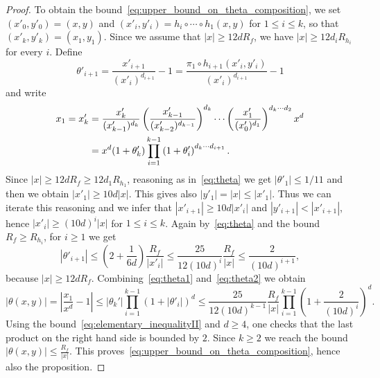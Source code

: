 \documentclass[oneside, 12pt]{amsart}
\newcommand{\abs}[1]{\left\vert#1\right\vert}
\newcommand{\lrpar}[1]{\left(#1\right)}
\theoremstyle{plain}
\theoremstyle{definition}
\numberwithin{equation}{section}       %
\numberwithin{equation}{section}       %
\begin{document}
\begin{proof}
To obtain the bound~\eqref{eq:upper_bound_on_theta_composition}, we set $(x'_0, y'_0)  = (x,y)$ and 
$(x'_i, y'_i) = h_i\circ\cdots \circ h_1 (x,y)$ for $1\leq i\leq k$, so that 
$(x'_k, y'_k) = (x_1, y_1)$. Since  we assume that 
$\abs{x}\geq 12dR_f$, we have $\abs{x}\geq 12d_iR_{h_i}$ for every $i$. 
Define 
\begin{equation}
\theta'_{i+1}   = \frac{x'_{i+1}}{(x'_i)^{d_{i+1}}} - 1 = \frac{\pi_1\circ h_{i+1} (x'_i, y'_i)}{(x'_i)^{d_{i+1}}} - 1
\end{equation}
and write 
\begin{align}\label{eq:theta1}
\notag x_1 = x'_k &= \frac{x'_k}{(x'_{k-1})^{d_k}}\lrpar{\frac{x'_{k-1}}{(x'_{k-2})^{d_{k-1}}}}^{d_k}\cdots 
\lrpar{\frac{x'_1}{(x'_0)^{d_1}}}^{d_k\cdots d_2} x^d\\ 
  &=  x^d (1+\theta'_k) \prod_{i=1}^{k-1} \lrpar{1+ \theta'_{i}}^{d_k\cdots d_{i+1}}. 
\end{align}
Since $\abs{x}\geq 12dR_f\geq 12 d_1R_{h_1}$, 
reasoning as in~\eqref{eq:theta} we get $\abs{\theta'_1}\leq 1/11$ and then we obtain $\abs{x'_1}\geq   10d \abs{x}$. 
This gives also $\abs{y'_1}  =     \abs{x}\leq \abs{x'_1}$. 
Thus we can iterate this reasoning and  we infer that 
$\abs{x'_{i+1}}%
\geq 10d \abs{x'_i}$ and  $\abs{y'_{i+1}} < \abs{x'_{i+1}}$, hence 
$\abs{x'_i} \geq (10d)^i \abs{x}$ for $1\leq i\leq k$. Again by~\eqref{eq:theta} and the bound 
$R_f\geq R_{h_i}$, for $i\geq 1$ we get
\begin{equation}
\label{eq:theta2}
\abs{\theta'_{i+1}}
\leq \left( 2+\frac{1}{6d} \right)  \frac{R_f}{\abs{x'_i}} 
\leq \frac{25}{12(10d)^i } \frac{R_f}{\abs{x} } 
\leq\frac{2}{(10d)^{i+1}}, 
\end{equation} 
because $\abs{x}\geq 12dR_f$.
Combining~\eqref{eq:theta1} and~\eqref{eq:theta2} we obtain  
\begin{equation*}
\abs{\theta (x,y)} =\abs{ \frac{x_1}{x^d} - 1} \leq   
\abs{\theta_k'}  \prod_{i=1}^{k-1} \lrpar{1+\abs{\theta'_i}}^d \leq  
\frac{25}{12 (10d)^{k-1}}  \frac{R_f}{\abs{x}}  \prod_{i=1}^{k-1} \lrpar{1+\frac{2}{(10d)^i}}^d  .
\end{equation*}
Using the bound~\eqref{eq:elementary_inequalityII} and $d\geq 4$, one checks that the last product on the right hand side is bounded by $2$. 
Since $k\geq 2$ we reach the bound $\abs{\theta (x,y)}\leq  \frac{R_f}{\abs{x}}$. 
This proves~\eqref{eq:upper_bound_on_theta_composition}, hence also the proposition.
\end{proof}
\end{document}
